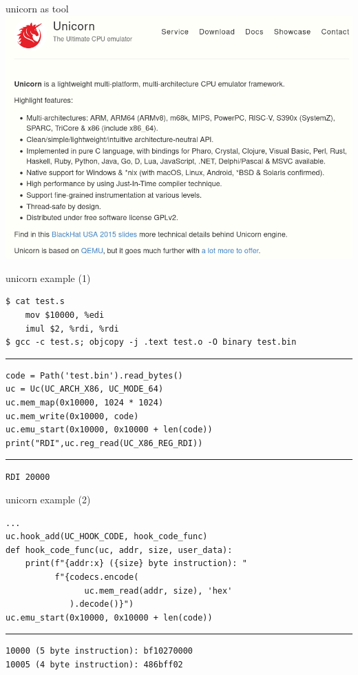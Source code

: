 
\begin{frame}{unicorn as tool}
\includegraphics[width=\textwidth]{../antianti/unicorn-page}
\end{frame}

\begin{frame}[fragile]{unicorn example (1)}
\begin{Verbatim}[fontsize=\small]
$ cat test.s
    mov $10000, %edi
    imul $2, %rdi, %rdi
$ gcc -c test.s; objcopy -j .text test.o -O binary test.bin
\end{Verbatim}
\vspace{.1cm}
\hrule
\vspace{.1cm}
\begin{Verbatim}[fontsize=\small]
code = Path('test.bin').read_bytes()
uc = Uc(UC_ARCH_X86, UC_MODE_64)
uc.mem_map(0x10000, 1024 * 1024)
uc.mem_write(0x10000, code)
uc.emu_start(0x10000, 0x10000 + len(code))
print("RDI",uc.reg_read(UC_X86_REG_RDI))
\end{Verbatim}
\vspace{.1cm}
\hrule
\vspace{.1cm}
\texttt{RDI 20000}
\end{frame}

\begin{frame}[fragile]{unicorn example (2)}
\begin{Verbatim}[fontsize=\small]
...
uc.hook_add(UC_HOOK_CODE, hook_code_func)
def hook_code_func(uc, addr, size, user_data):
    print(f"{addr:x} ({size} byte instruction): "
          f"{codecs.encode(
                uc.mem_read(addr, size), 'hex'
             ).decode()}")
uc.emu_start(0x10000, 0x10000 + len(code))
\end{Verbatim}
\hrule
\begin{Verbatim}[fontsize=\small]
10000 (5 byte instruction): bf10270000
10005 (4 byte instruction): 486bff02
\end{Verbatim}
\end{frame}


